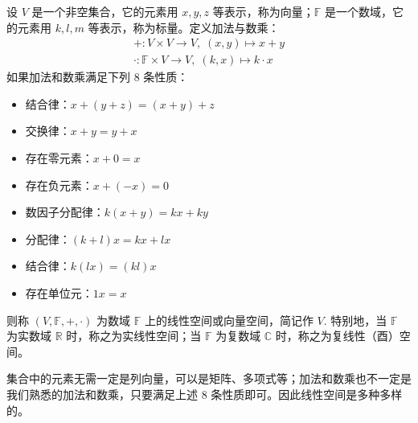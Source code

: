 \begin{definition}
设 $V$ 是一个非空集合，它的元素用 $x,y,z$ 等表示，称为向量；$\mathbb F$ 是一个数域，它的元素用 $k,l,m$ 等表示，称为标量。定义加法与数乘：
\begin{gather*}
    +:V\times V\to V,\;(x,y)\mapsto x+y\\
    \cdot:\mathbb F\times V\to V,\;(k,x)\mapsto k\cdot x
\end{gather*}
如果加法和数乘满足下列 8 条性质：
\begin{itemize}
    \item 结合律：$x+(y+z)=(x+y)+z$
    \item 交换律：$x+y=y+x$
    \item 存在零元素：$x+0=x$
    \item 存在负元素：$x+(-x)=0$
    \item 数因子分配律：$k(x+y)=kx+ky$
    \item 分配律：$(k+l)x=kx+lx$
    \item 结合律：$k(lx)=(kl)x$
    \item 存在单位元：$1x=x$
\end{itemize}
则称 $(V,\mathbb F,+,\cdot)$ 为数域 $\mathbb F$ 上的线性空间或向量空间，简记作 $V$. 特别地，当 $\mathbb F$ 为实数域 $\mathbb R$ 时，称之为实线性空间；当 $\mathbb F$ 为复数域 $\mathbb C$ 时，称之为复线性（酉）空间。
\end{definition}

\begin{remark}
集合中的元素无需一定是列向量，可以是矩阵、多项式等；加法和数乘也不一定是我们熟悉的加法和数乘，只要满足上述 8 条性质即可。因此线性空间是多种多样的。
\end{remark}

